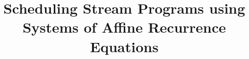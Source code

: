 \documentclass{sig-alternate}
\title{Scheduling Stream Programs using \\ Systems of Affine Recurrence Equations \vspace{-12pt}}
\date{}
\begin{document}
  \maketitle

  \newcommand{\mt}[1]{\mbox{\it #1}}
  \newcommand{\todo}[1]{\framebox{\bf #1}}
  \newcommand{\sssection}[1]{\medskip \noindent {\bf #1} \smallskip}

  \begin{abstract}
    
  \end{abstract}

  

  \cite{streamitcc}

  \begin{small}
      
      
  \end{small}
  
\end{document}
